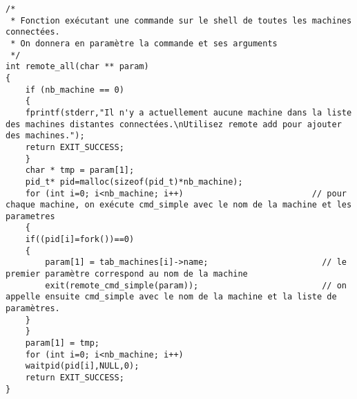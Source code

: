 \documentclass[12pt]{article}
\begin{document}
\begin{verbatim}
/* 
 * Fonction exécutant une commande sur le shell de toutes les machines connectées.
 * On donnera en paramètre la commande et ses arguments
 */
int remote_all(char ** param) 
{
    if (nb_machine == 0)
    {
	fprintf(stderr,"Il n'y a actuellement aucune machine dans la liste des machines distantes connectées.\nUtilisez remote add pour ajouter des machines.");
	return EXIT_SUCCESS;
    }
    char * tmp = param[1];
    pid_t* pid=malloc(sizeof(pid_t)*nb_machine);
    for (int i=0; i<nb_machine; i++)                          // pour chaque machine, on exécute cmd_simple avec le nom de la machine et les parametres
    {
	if((pid[i]=fork())==0)
	{
	    param[1] = tab_machines[i]->name;                       // le premier paramètre correspond au nom de la machine  
	    exit(remote_cmd_simple(param));                         // on appelle ensuite cmd_simple avec le nom de la machine et la liste de paramètres.
	}
    }
    param[1] = tmp;
    for (int i=0; i<nb_machine; i++)
	waitpid(pid[i],NULL,0);
    return EXIT_SUCCESS;
}
				  

\end{verbatim}
\label{}
\begin{verbatim}
 
\end{verbatim}
\end{document}
